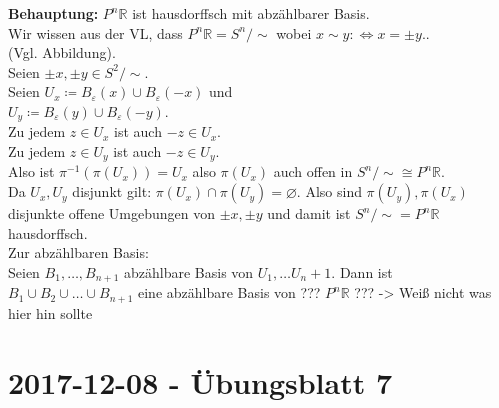 \begin{problem*}[3b]
\textbf{Behauptung:} $ P^n\mathbb{R}$ ist hausdorffsch mit abzählbarer Basis.\\
Wir wissen aus der VL, dass $ P^n\mathbb{R} = S^n / \sim $ wobei $x \sim y :\Leftrightarrow x = \pm y.$.\\
(Vgl. Abbildung). \\
Seien $\pm x, \pm y \in S^2 / \sim $. \\
Seien $U_x \coloneqq B_\varepsilon(x) \cup B_\varepsilon(-x)$ und \\
$U_y \coloneqq B_\varepsilon(y) \cup B_\varepsilon(-y)$.\\
Zu jedem $ z \in U_x$ ist auch $-z \in U_x$.\\
Zu jedem $ z \in U_y$ ist auch $-z \in U_y$.\\
Also ist $\pi^{ -1 } (\pi(U_x)) = U_x$ also $\pi(U_x)$ auch offen in $S^n / \sim \cong P^n\mathbb{R} $.\\
Da $U_x, U_y$ disjunkt gilt: $\pi(U_x) \cap \pi(U_y) = \varnothing$. Also sind $\pi(U_y), \pi(U_x)$ disjunkte offene Umgebungen von $\pm x, \pm y$ und damit ist $S^n / \sim = P^n\mathbb{R} $ hausdorffsch.\\
Zur abzählbaren Basis: \\
Seien $B_1, \dots, B_{ n+1 }$ abzählbare Basis von $U_1, \dots U_n+1$. Dann ist $ B_1 \cup B_2 \cup \dots \cup B_{ n+1 }$ eine abzählbare Basis von ??? $P^n\mathbb{R}$ ??? -> Weiß nicht was hier hin sollte



\end{problem*}

\newpage
\section{2017-12-08 - Übungsblatt 7} %
\label{sub:2017_12_08}

